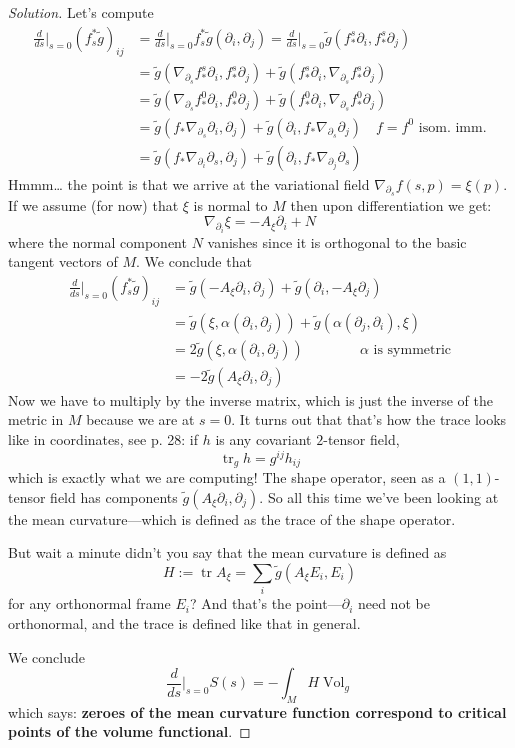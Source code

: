 \begin{proof}[Solution]
Let's compute
\begin{align*}
\frac{d}{ds}\Big|_{s=0}(f_s^*\tilde{g})_{ij}&=\frac{d}{ds}\Big|_{s=0}f_s^*\tilde{g}\left(\partial_i,\partial_j\right)=\frac{d}{ds}\Big|_{s=0}\tilde{g}(f^s_*\partial_i,f^s_*\partial_j)\\
&=\tilde{g}\left(\nabla_{\partial_s}f^s_*\partial_i,f^s_*\partial_j\right)+\tilde{g}\left(f^s_*\partial_i,\nabla_{\partial_s}f_*^s\partial_j\right)\\
&=\tilde{g}\left(\nabla_{\partial_s}f^0_*\partial_i,f_*^0\partial_j\right)+\tilde{g}\left(f^0_*\partial_i,\nabla_{\partial_s}f_*^0\partial_j\right)\\
&=\tilde{g}\left(f_*\nabla_{\partial_s}\partial_i,\partial_j\right)+\tilde{g}\left(\partial_i,f_* \nabla_{\partial_s}\partial_j\right)\quad \text{\(f=f^0\) isom. imm.}\\
&=\tilde{g}\left(f_*\nabla_{\partial_i}\partial_s,\partial_j\right)+\tilde{g}\left(\partial_i,f_* \nabla_{\partial_j}\partial_s\right)
\end{align*}
Hmmm… the point is that we arrive at the variational field \(\nabla_{\partial_s}f(s,p)=\xi(p)\). If we assume (for now) that \(\xi\) is normal to \(M\) then upon differentiation we get:
\[\nabla_{\partial_i}\xi=-A_{\xi}\partial_i+N\]
where the normal component \(N\) vanishes since it is orthogonal to the basic tangent vectors of \(M\). We conclude that
\begin{align*}
\frac{d}{ds}\Big|_{s=0}(f_s^*\tilde{g})_{ij}&=\tilde{g}\left(-A_{\xi}\partial_i,\partial_j\right)+\tilde{g}\left(\partial_i,-A_{\xi}\partial_j\right)\\
&=\tilde{g}(\xi,\alpha(\partial_i,\partial_j))+\tilde{g}(\alpha(\partial_j,\partial_i),\xi)\\
&=2\tilde{g}(\xi,\alpha(\partial_i,\partial_j))\qquad\qquad \text{\(\alpha\) is symmetric}\\
&=-2\tilde{g}(A_{\xi}\partial_i,\partial_j)
\end{align*}
Now we have to multiply by the inverse matrix, which is just the inverse of the metric in \(M\) because we are at \(s=0\). It turns out that that's how the trace looks like in coordinates, see  \cite{ler} p. 28: if \(h\) is any covariant \(2\)-tensor field,
\[\operatorname{tr}_gh=g^{ij}h_{ij}\]
which is exactly what we are computing! The shape operator, seen as a \((1,1)\)-tensor field has components \(\tilde{g}(A_{\xi}\partial_i,\partial_j)\). So all this time we've been looking at the mean curvature---which is defined as the trace of the shape operator.

But wait a minute didn't you say that the mean curvature is defined as
\[H:=\operatorname{tr}A_{\xi}=\sum_i \tilde{g}(A_{\xi}E_i,E_i)\]
for any orthonormal frame \(E_i\)? And that's the point---\(\partial_i\) need not be orthonormal, and the trace is defined like that in general.

We conclude
\[\frac{d}{ds}\Big|_{s=0}S(s)=-\int_M H \operatorname{Vol}_{g}\]
which says: \textbf{zeroes of the mean curvature function correspond to critical points of the volume functional}.
\end{proof}

